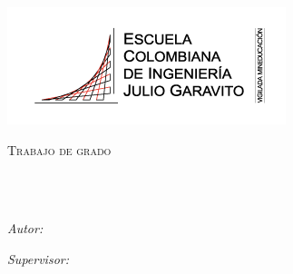 \documentclass[
11pt, %
spanish, %
singlespacing, %
headsepline, %
]{MastersDoctoralThesis} %
\author{Ing. Fabio Enrique \textsc{Quintero} DiazGranados} %
\begin{document}
\frontmatter %

\pagestyle{plain} %


\begin{titlepage}
\begin{center}
\includegraphics[scale=0.5]{Images/1110_logotipo_institucional_vm300px.png} 
\\
\vspace*{.06\textheight}
{\scshape\LARGE \univname\par}\vspace{1.5cm} %
\textsc{\Large Trabajo de grado}\\[0.5cm] %

\HRule \\[0.4cm] %
{\huge \bfseries \ttitle\par}\vspace{0.4cm} %
\HRule \\[1.5cm] %
 
\begin{minipage}[t]{0.4\textwidth}
\begin{flushleft} \large
\emph{Autor:}\\
{\authorname} %
\end{flushleft}
\end{minipage}
\begin{minipage}[t]{0.4\textwidth}
\begin{flushright} \large
\emph{Supervisor:} \\
{\supname} %
\end{flushright}
\end{minipage}\\[3cm]
 

\end{center}
\end{titlepage}
\end{document}
